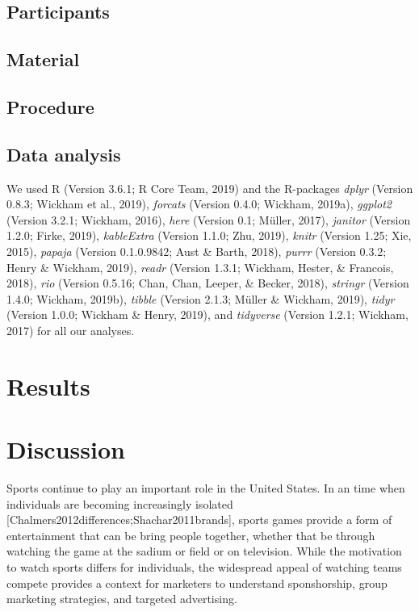 \documentclass[man]{apa6}
\begin{document}
\hypertarget{participants}{%
\subsection{Participants}\label{participants}}

\hypertarget{material}{%
\subsection{Material}\label{material}}

\hypertarget{procedure}{%
\subsection{Procedure}\label{procedure}}

\hypertarget{data-analysis}{%
\subsection{Data analysis}\label{data-analysis}}

We used R (Version 3.6.1; R Core Team, 2019) and the R-packages \emph{dplyr} (Version 0.8.3; Wickham et al., 2019), \emph{forcats} (Version 0.4.0; Wickham, 2019a), \emph{ggplot2} (Version 3.2.1; Wickham, 2016), \emph{here} (Version 0.1; Müller, 2017), \emph{janitor} (Version 1.2.0; Firke, 2019), \emph{kableExtra} (Version 1.1.0; Zhu, 2019), \emph{knitr} (Version 1.25; Xie, 2015), \emph{papaja} (Version 0.1.0.9842; Aust \& Barth, 2018), \emph{purrr} (Version 0.3.2; Henry \& Wickham, 2019), \emph{readr} (Version 1.3.1; Wickham, Hester, \& Francois, 2018), \emph{rio} (Version 0.5.16; Chan, Chan, Leeper, \& Becker, 2018), \emph{stringr} (Version 1.4.0; Wickham, 2019b), \emph{tibble} (Version 2.1.3; Müller \& Wickham, 2019), \emph{tidyr} (Version 1.0.0; Wickham \& Henry, 2019), and \emph{tidyverse} (Version 1.2.1; Wickham, 2017) for all our analyses.

\hypertarget{results}{%
\section{Results}\label{results}}

\hypertarget{discussion}{%
\section{Discussion}\label{discussion}}

Sports continue to play an important role in the United States. In an time when individuals are becoming increasingly isolated {[}Chalmers2012differences;Shachar2011brands{]}, sports games provide a form of entertainment that can be bring people together, whether that be through watching the game at the sadium or field or on television. While the motivation to watch sports differs for individuals, the widespread appeal of watching teams compete provides a context for marketers to understand sponshorship, group marketing strategies, and targeted advertising.
\end{document}
